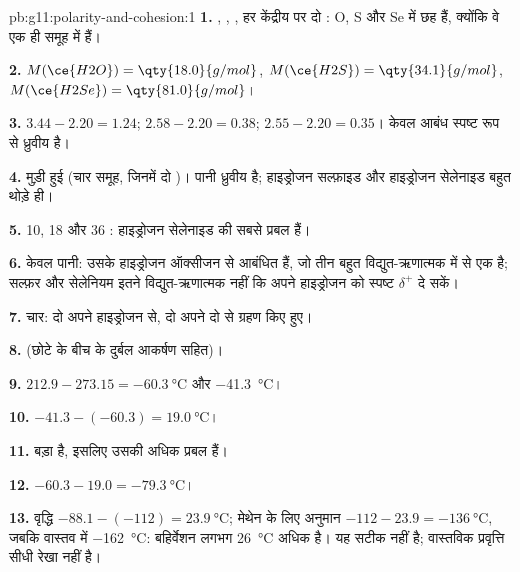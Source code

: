 \begin{solution}{pb:g11:polarity-and-cohesion:1}
\textbf{1.} , , , हर केंद्रीय  पर
दो : O, S और Se में छह  हैं, क्योंकि वे एक ही
समूह में हैं।

\textbf{2.} $M(\ce{H2O}) = \qty{18.0}{g/mol}$, $M(\ce{H2S}) =
\qty{34.1}{g/mol}$, $M(\ce{H2Se}) = \qty{81.0}{g/mol}$।

\textbf{3.} $3.44 - 2.20 = 1.24$; $2.58 - 2.20 = 0.38$;
$2.55 - 2.20 = 0.35$। केवल  आबंध स्पष्ट रूप से ध्रुवीय है।

\textbf{4.} मुड़ी हुई (चार समूह, जिनमें दो )। पानी ध्रुवीय है;
हाइड्रोजन सल्फ़ाइड और हाइड्रोजन सेलेनाइड बहुत थोड़े ही।

\textbf{5.} 10, 18 और 36 : हाइड्रोजन सेलेनाइड की
 सबसे प्रबल हैं।

\textbf{6.} केवल पानी: उसके हाइड्रोजन  ऑक्सीजन से आबंधित हैं, जो तीन बहुत
विद्युत-ऋणात्मक  में से एक है; सल्फ़र और सेलेनियम इतने
विद्युत-ऋणात्मक नहीं कि अपने हाइड्रोजन  को स्पष्ट
$\delta^+$ दे सकें।

\textbf{7.} चार: दो अपने हाइड्रोजन  से, दो अपने
दो  से ग्रहण किए हुए।

\textbf{8.}  (छोटे  के बीच के
दुर्बल आकर्षण सहित)।

\textbf{9.} $212.9 - 273.15 = \qty{-60.3}{\celsius}$ और
\qty{-41.3}{\celsius}।

\textbf{10.} $-41.3 - (-60.3) = \qty{19.0}{\celsius}$।

\textbf{11.}  बड़ा है, इसलिए उसकी 
अधिक प्रबल हैं।

\textbf{12.} $-60.3 - 19.0 = \qty{-79.3}{\celsius}$।

\textbf{13.} वृद्धि $-88.1 - (-112) = \qty{23.9}{\celsius}$; मेथेन के लिए
अनुमान $-112 - 23.9 = \qty{-136}{\celsius}$, जबकि वास्तव में \qty{-162}{\celsius}:
बहिर्वेशन लगभग \qty{26}{\celsius} अधिक है। यह
सटीक नहीं है; वास्तविक प्रवृत्ति सीधी रेखा नहीं है।


\end{solution}
